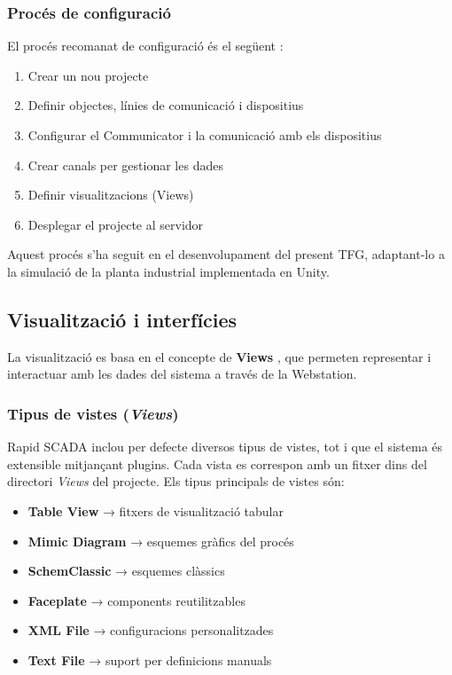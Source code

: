 \documentclass[a4paper,11pt,DIV=13,headings=normal,abstract=true,twoside=semi]{article}
\begin{document}
\subsubsection{Procés de configuració}

 El procés recomanat de configuració és el següent \cite{rapidscada_config_basics}:

\begin{enumerate}
    \item Crear un nou projecte
    \item Definir objectes, línies de comunicació i dispositius
    \item Configurar el Communicator i la comunicació amb els dispositius
    \item Crear canals per gestionar les dades
    \item Definir visualitzacions (Views)
    \item Desplegar el projecte al servidor
\end{enumerate}

Aquest procés s'ha seguit en el desenvolupament del present TFG, adaptant-lo a la simulació de la planta industrial implementada en Unity.

\subsection{Visualització i interfícies}
La visualització es basa en el concepte de \textbf{Views} \cite{rapidscada_views}, que permeten representar i interactuar amb les dades del sistema a través de la Webstation.


\subsubsection*{Tipus de vistes (\textit{Views})}

Rapid SCADA inclou per defecte diversos tipus de vistes, tot i que el sistema és extensible mitjançant plugins. Cada vista es correspon amb un fitxer dins del directori \textit{Views} del projecte. Els tipus principals de vistes són:


\begin{itemize}
    \item \textbf{Table View} → fitxers de visualització tabular
    \item \textbf{Mimic Diagram} → esquemes gràfics del procés 
    \item \textbf{SchemClassic} → esquemes clàssics 
    \item \textbf{Faceplate} → components reutilitzables 
    \item \textbf{XML File} → configuracions personalitzades
    \item \textbf{Text File} → suport per definicions manuals
\end{itemize}
\end{document}
